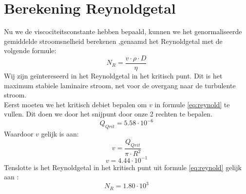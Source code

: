 \section{Berekening Reynoldgetal}

Nu we de viscociteitsconstante hebben bepaald, kunnen we het genormaliseerde gemiddelde stroomsnelheid berekenen
,genaamd het Reynoldgetal met de volgende formule:
\begin{equation}
    \label{eq:reynold}
    N_R = \frac{v\cdot \rho \cdot D}{\eta}
\end{equation}
Wij zijn geïntereseerd in het Reynoldgetal in het kritisch punt. Dit is het maximum stabiele
laminaire stroom, net voor de overgang naar de turbulente stroom.\\

Eerst moeten we het kritisch debiet bepalen om $v$ in formule \eqref{eq:reynold} te vullen.
Dit doen we door het snijpunt door onze 2 rechten te bepalen.
\begin{equation*}
    Q_{Qrit} = 5.58 \cdot 10^{-6}
\end{equation*}
Waardoor $v$ gelijk is aan:
\begin{equation}
    v = \frac{Q_{Qrit}}{\pi \cdot R^2}
\end{equation}
\begin{equation*}
    v = 4.44 \cdot 10^{-1}
\end{equation*}
Tenslotte is het Reynoldgetal in het kritisch punt uit formule \eqref{eq:reynold} gelijk aan :
\begin{equation*}
    N_R = 1.80 \cdot 10^{3}
\end{equation*}
